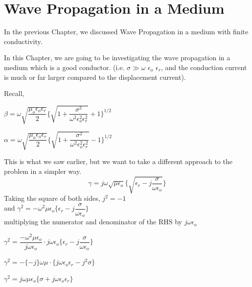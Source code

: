 \chapter{Wave Propagation in a Medium}\label{lec:lec26}
In the previous Chapter, we discussed Wave Propagation in a medium with finite conductivity.

In this Chapter, we are going to be investigating the wave propagation in a medium which is a good conductor. (i.e. $\sigma \gg \omega$ $\epsilon_{o}$ $\epsilon_{r}$, and the conduction current is much or far larger compared to the displacement current). \newline

Recall,
\begin{center}
$\beta=\omega\sqrt{\dfrac{\mu_{o}\epsilon_{o}\epsilon_{r}}{2}}\Bigg\{{\sqrt{1+\dfrac{\sigma^{2}}{\omega^{2}\epsilon_{o}^{2}\epsilon_{r}^{2}}}+1 }\Bigg\}^{1/2}$
\end{center}

\begin{center}
$\alpha=\omega\sqrt{\dfrac{\mu_{o}\epsilon_{o}\epsilon_{r}}{2}}\Bigg\{\sqrt{1+\dfrac{\sigma^{2}}{\omega^{2}\epsilon_{o}^{2}\epsilon_{r}^{2}}}  -1\Bigg\}^{1/2}$	
\end{center}

This is what we saw earlier, but we want to take a different approach to the problem in a simpler way.
\begin{equation}
\gamma=j\omega\sqrt{\mu\epsilon_{o}}\Bigg\{\sqrt{\epsilon_{r}-j\dfrac{\sigma}{\omega\epsilon_{o}}}\Bigg\}
\end{equation}		
Taking the square of both sides,
$j^{2}= -1$\\ 
 and $\gamma^{2}=-\omega^{2}\mu\epsilon_{o}\Bigg\{\epsilon_{r}-j\dfrac{\sigma}{\omega\epsilon_{o}}\Bigg\}$\\
multiplying the numerator and denominator of the RHS  by $j\omega\epsilon_{o}$

$\gamma^{2}=\dfrac{-\omega^{2}\mu\epsilon_{o}}{j\omega\epsilon_{o}}\cdot j\omega\epsilon_{o}\Bigg\{\epsilon_{r}-j\dfrac{\sigma}{\omega\epsilon_{o}}\Bigg\}$

\begin{center}
$\gamma^{2}=-\{-j\}\omega\mu\cdot\{j\omega\epsilon_{o}\epsilon_{r}-j^{2}\sigma\}$
\end{center}

\begin{center}
$\gamma^{2}=j\omega\mu\epsilon_{o}\{\sigma+j\omega\epsilon_{o}\epsilon_{r}\}$	
\end{center}

